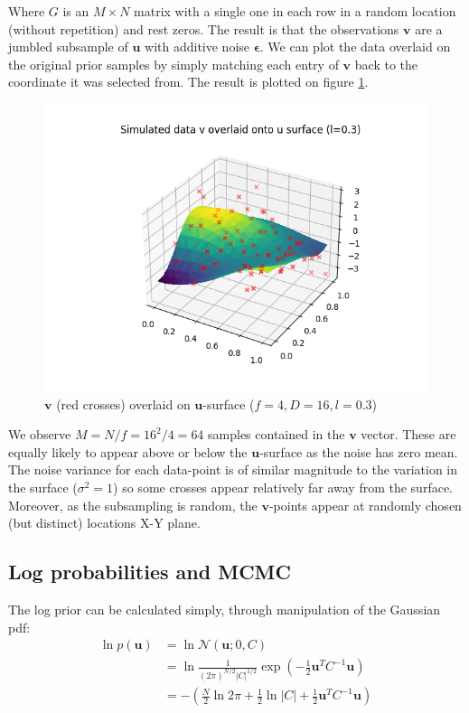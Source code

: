 \documentclass[]{article}
\newcommand{\figwidth}{0.6\linewidth}
\newcommand{\Ncal}{\mathcal{N}}
\newcommand{\ubold}{\boldsymbol{u}}
\newcommand{\vbold}{\boldsymbol{v}}
\newcommand{\epsbold}{\boldsymbol{\epsilon}}
\begin{document}
Where $G$ is an $M \times N$ matrix with a single one in each row in a random location (without repetition) and rest zeros. The result is that the observations $\vbold$ are a jumbled subsample of $\ubold$ with additive noise $\epsbold$. We can plot the data overlaid on the original prior samples by simply matching each entry of $\vbold$ back to the coordinate it was selected from. The result is plotted on figure \ref{fig:v-on-u}.
%
\begin{figure}[!h]
	\centering
	\includegraphics[width=\figwidth]{v-overlay.png}
	\caption{$\vbold$ (red crosses) overlaid on $\ubold$-surface ($f=4, D=16, l=0.3$)}
	\label{fig:v-on-u}
\end{figure}

We observe $M=N/f=16^2/4=64$ samples contained in the $\vbold$ vector. These are equally likely to appear above or below the $\ubold$-surface as the noise has zero mean. The noise variance for each data-point is of similar magnitude to the variation in the surface ($\sigma^2 = 1$) so some crosses appear relatively far away from the surface. Moreover, as the subsampling is random, the $\vbold$-points appear at randomly chosen (but distinct) locations X-Y plane.

\subsection{Log probabilities and MCMC}

The log prior can be calculated simply, through manipulation of the Gaussian pdf:
%
\begin{align}
	\ln p (\ubold) &= \ln \Ncal(\ubold; 0, C) \nonumber \\
	&= \ln \frac{1}{(2\pi)^{N/2} |C|^{1/2}} \exp \left( - \frac{1}{2} \ubold^T C^{-1} \ubold \right) \nonumber \\
	&= - \left( \frac{N}{2} \ln 2\pi + \frac{1}{2} \ln |C| + \frac{1}{2} \ubold^T C^{-1} \ubold \right)
	\label{eqn:log-prior}
\end{align}
\end{document}
